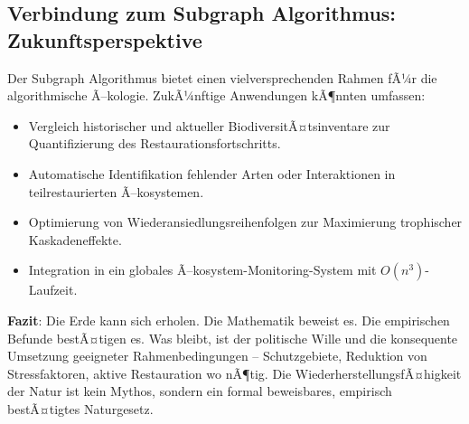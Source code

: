 ﻿\documentclass[a4paper,12pt]{article}
\theoremstyle{definition}
\begin{document}
\subsection{Verbindung zum Subgraph Algorithmus: Zukunftsperspektive}

Der Subgraph Algorithmus \cite{epp2026subgraph} bietet einen vielversprechenden Rahmen fÃ¼r die algorithmische Ã–kologie. ZukÃ¼nftige Anwendungen kÃ¶nnten umfassen:
\begin{itemize}
	\item Vergleich historischer und aktueller BiodiversitÃ¤tsinventare zur Quantifizierung des Restaurationsfortschritts.
	\item Automatische Identifikation fehlender Arten oder Interaktionen in teilrestaurierten Ã–kosystemen.
	\item Optimierung von Wiederansiedlungsreihenfolgen zur Maximierung trophischer Kaskadeneffekte.
	\item Integration in ein globales Ã–kosystem-Monitoring-System mit $O(n^3)$-Laufzeit.
\end{itemize}

\medskip
\noindent\textbf{Fazit}: Die Erde kann sich erholen. Die Mathematik beweist es. Die empirischen Befunde bestÃ¤tigen es. Was bleibt, ist der politische Wille und die konsequente Umsetzung geeigneter Rahmenbedingungen -- Schutzgebiete, Reduktion von Stressfaktoren, aktive Restauration wo nÃ¶tig. Die WiederherstellungsfÃ¤higkeit der Natur ist kein Mythos, sondern ein formal beweisbares, empirisch bestÃ¤tigtes Naturgesetz.
\end{document}
